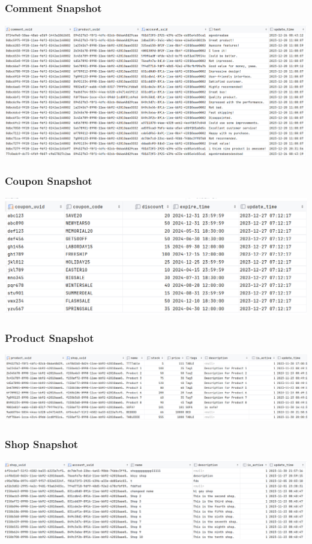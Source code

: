 \documentclass[a4paper, 12pt]{article}
\begin{document}
\subsubsection{Comment Snapshot}
\includegraphics[scale=0.4]{snapshots/comment.png}
\subsubsection{Coupon Snapshot}
\includegraphics[scale=0.4]{snapshots/coupon.png}
\subsubsection{Product Snapshot}
\includegraphics[scale=0.4]{snapshots/product.png}
\subsubsection{Shop Snapshot}
\includegraphics[scale=0.4]{snapshots/shop.png}
\end{document}
